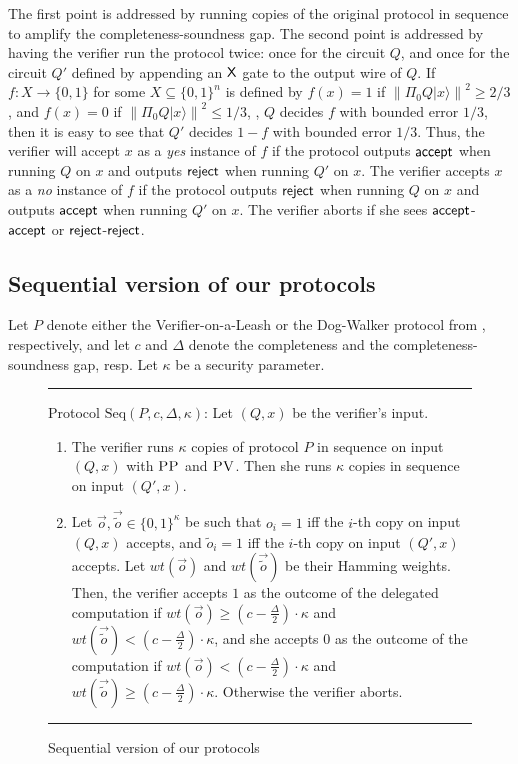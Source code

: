 \documentclass{toc}
\newcommand{\ket}[1]{|#1\rangle}
\newcommand{\norm}[1]{\left\|#1\right\|}
\newcommand{\pv}{\textsc{PV}}
\newcommand{\pp}{\textsc{PP}}
\begin{document}
The first point is addressed by running copies of the original protocol in sequence to amplify the completeness-soundness gap. The second point is addressed by having the verifier run the protocol twice: once for the circuit $Q$, and once for the circuit $Q'$ defined by appending an $\sf X$ gate to the output wire of $Q$. If $f:X\rightarrow \{0,1\}$ for some $X\subseteq \{0,1\}^n$ is defined by $f(x)=1$ if $\norm{\Pi_0 Q\ket{x}}^2\geq 2/3$, and $f(x)=0$ if $\norm{\Pi_0 Q\ket{x}}^2\leq 1/3$, \ie, $Q$ decides $f$ with bounded error $1/3$, then it is easy to see that $Q'$ decides $1-f$ with bounded error $1/3$. Thus, the verifier will accept $x$ as a \textit{yes} instance of $f$ if the protocol outputs ${\sf accept}$ when running $Q$ on $x$ and outputs $\sf reject$ when running $Q'$ on $x$. The verifier accepts $x$ as a \textit{no} instance of $f$ if the protocol outputs $\sf reject$ when running $Q$ on $x$ and outputs $\sf accept$ when running $Q'$ on $x$. The verifier aborts if she sees $\sf accept$-$\sf accept$ or $\sf reject$-$\sf reject$. 



\subsection{Sequential version of our protocols}


Let $P$ denote either the %
Verifier-on-a-Leash  %
or the Dog-Walker protocol from  , respectively, %
and let $c$ and $\Delta$ denote the completeness and 
the completeness-soundness gap, resp.  %
Let $\kappa$ be a security parameter.

\begin{figure}[H]
\rule[1ex]{16.5cm}{0.5pt}
\justify
Protocol $\mbox{Seq}(P,c,\Delta, \kappa)$: Let $(Q,x)$ be the verifier's input. 
\begin{enumerate}
\item The verifier runs $\kappa$ copies of protocol $P$ in sequence on input $(Q,x)$ with $\pp$ and $\pv$. Then she runs $\kappa$ copies in sequence on input $(Q',x)$. 
\item Let $\vec{o}, \vec{\tilde{o}} \in \{0,1\}^{\kappa}$ be such that $o_i = 1$ iff the $i$-th copy on input $(Q,x)$ accepts, and $\tilde{o}_i = 1$ iff the $i$-th copy on input $(Q',x)$ accepts. Let $wt(\vec{o})$ and $wt(\vec{\tilde{o}})$ be their Hamming weights. Then, the verifier accepts $1$ as the outcome of the delegated computation if $wt(\vec{o}) \geq (c- \frac{\Delta}{2}) \cdot \kappa$ and $wt(\vec{\tilde{o}}) < (c- \frac{\Delta}{2}) \cdot \kappa$, and she accepts $0$ as the outcome of the computation if $wt(\vec{o}) < (c- \frac{\Delta}{2})\cdot \kappa$ and $wt(\vec{\tilde{o}}) \geq (c- \frac{\Delta}{2}) \cdot \kappa$. Otherwise the verifier aborts.

\end{enumerate}
\rule[2ex]{16.5cm}{0.5pt}\vspace{-.5cm}
\caption{Sequential version of our protocols} \label{fig: gardenhose-protocol-parallel}
\end{figure}
\end{document}
